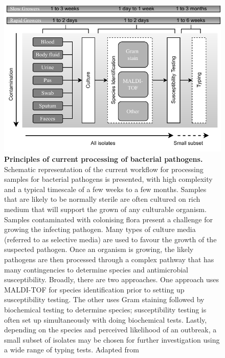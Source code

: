 \begin{figure}[h!]
\centering
\includegraphics[width=\textwidth]{figures/introduction/Figure 2.pdf}
\caption{\textbf{Principles of current processing of bacterial pathogens.} Schematic representation of the current workflow for processing samples for bacterial pathogens is presented, with high complexity and a typical timescale of a few weeks to a few months. Samples that are likely to be normally sterile are often cultured on rich medium that will support the grown of any culturable organism. Samples contaminated with colonising flora present a challenge for growing the infecting pathogen. Many types of culture media (referred to as selective media) are used to favour the growth of the suspected pathogen.
Once an organism is growing, the likely pathogens are then processed through a complex pathway that has many contingencies to determine species and antimicrobial susceptibility. Broadly, there are two approaches. One approach uses MALDI-TOF for species identification prior to setting up susceptibility testing. The other uses Gram staining followed by biochemical testing to determine species; susceptibility testing is often set up simultaneously with doing biochemical tests. Lastly, depending on the species and perceived likelihood of an outbreak, a small subset of isolates may be chosen for further investigation using a wide range of typing tests. Adapted from \cite{didelot_transforming_2012}}
\label{fig:figure2}
\end{figure}

